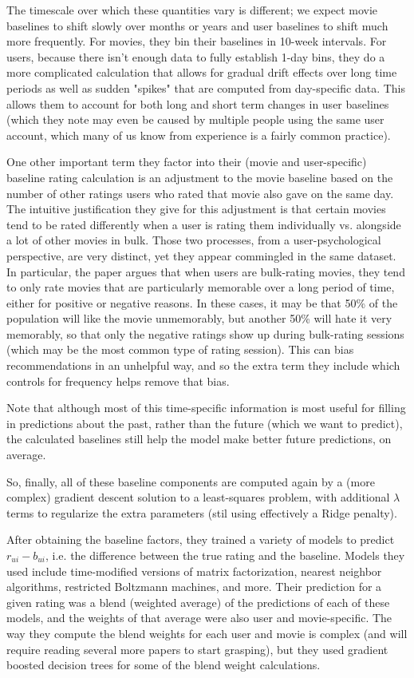\documentclass[11pt]{article}
\begin{document}
The timescale over which these quantities vary is different; we expect movie baselines to shift slowly over months or years and user baselines to shift much more frequently. For movies, they bin their baselines in 10-week intervals. For users, because there isn't enough data to fully establish 1-day bins, they do a more complicated calculation that allows for gradual drift effects over long time periods as well as sudden "spikes" that are computed from day-specific data. This allows them to account for both long and short term changes in user baselines (which they note may even be caused by multiple people using the same user account, which many of us know from experience is a fairly common practice).

One other important term they factor into their (movie and user-specific) baseline rating calculation is an adjustment to the movie baseline based on the number of other ratings users who rated that movie also gave on the same day. The intuitive justification they give for this adjustment is that certain movies tend to be rated differently when a user is rating them individually vs. alongside a lot of other movies in bulk. Those two processes, from a user-psychological perspective, are very distinct, yet they appear commingled in the same dataset. In particular, the paper argues that when users are bulk-rating movies, they tend to only rate movies that are particularly memorable over a long period of time, either for positive or negative reasons. In these cases, it may be that 50\% of the population will like the movie unmemorably, but another 50\% will hate it very memorably, so that only the negative ratings show up during bulk-rating sessions (which may be the most common type of rating session). This can bias recommendations in an unhelpful way, and so the extra term they include which controls for frequency helps remove that bias.

Note that although most of this time-specific information is most useful for filling in predictions about the past, rather than the future (which we want to predict), the calculated baselines still help the model make better future predictions, on average.

So, finally, all of these baseline components are computed again by a (more complex) gradient descent solution to a least-squares problem, with additional $\lambda$ terms to regularize the extra parameters (stil using effectively a Ridge penalty).

After obtaining the baseline factors, they trained a variety of models to predict $r_{ui} - b_{ui}$, i.e. the difference between the true rating and the baseline. Models they used include time-modified versions of matrix factorization, nearest neighbor algorithms, restricted Boltzmann machines, and more. Their prediction for a given rating was a blend (weighted average) of the predictions of each of these models, and the weights of that average were also user and movie-specific. The way they compute the blend weights for each user and movie is complex (and will require reading several more papers to start grasping), but they used gradient boosted decision trees for some of the blend weight calculations.
\end{document}

